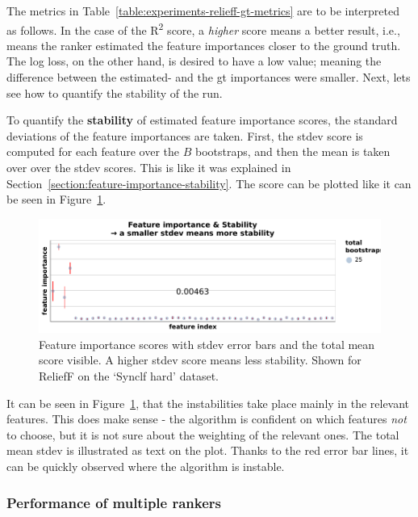\documentclass[../main.tex]{subfiles}
\begin{document}
The metrics in Table~\ref{table:experiments-relieff-gt-metrics} are to be interpreted as follows. In the case of the R\textsuperscript{2} score, a \textit{higher} score means a better result, i.e., means the ranker estimated the feature importances closer to the ground truth. The log loss, on the other hand, is desired to have a low value; meaning the difference between the estimated- and the \gls{gt} importances were smaller. Next, lets see how to quantify the stability of the run.

To quantify the \textbf{stability} of estimated feature importance scores, the standard deviations of the feature importances are taken. First, the stdev score is computed for each feature over the $B$ bootstraps, and then the mean is taken over over the stdev scores. This is like it was explained in Section~\ref{section:feature-importance-stability}. The score can be plotted like it can be seen in Figure~\ref{fig:results-importances-stability-relieff-example}.

\begin{figure}[ht]
    \centering
    \includegraphics[width=0.8\linewidth]{report/images/results-importances-stability-relieff-example.pdf}
    \caption{Feature importance scores with stdev error bars and the total mean score visible. A higher stdev score means less stability. Shown for ReliefF on the `Synclf hard' dataset.}
    \label{fig:results-importances-stability-relieff-example}
\end{figure}

It can be seen in Figure~\ref{fig:results-importances-stability-relieff-example}, that the instabilities take place mainly in the relevant features. This does make sense - the algorithm is confident on which features \textit{not} to choose, but it is not sure about the weighting of the relevant ones. The total mean stdev is illustrated as text on the plot. Thanks to the red error bar lines, it can be quickly observed where the algorithm is instable. 

\subsubsection{Performance of multiple rankers}
\end{document}
